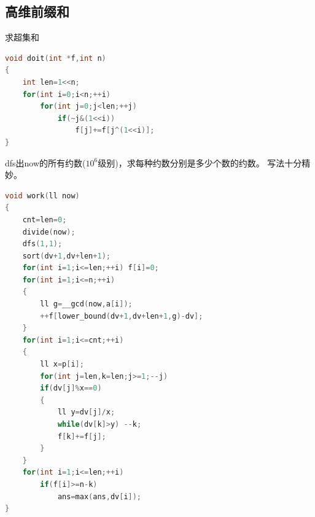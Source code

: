 \documentclass[UTF8,a4paper,titlepage]{ctexart}
\begin{document}
\subsection{高维前缀和}
求超集和
\begin{lstlisting}[language=C++] 
void doit(int *f,int n)
{
    int len=1<<n;
    for(int i=0;i<n;++i)
        for(int j=0;j<len;++j)
            if(~j&(1<<i))
                f[j]+=f[j^(1<<i)];
}
\end{lstlisting}

dfs出now的所有约数($10^6$级别)，求每种约数分别是多少个数的约数。
写法十分精妙。
\begin{lstlisting}[language=C++] 
void work(ll now)
{
    cnt=len=0;
    divide(now);
    dfs(1,1);
    sort(dv+1,dv+len+1);
    for(int i=1;i<=len;++i) f[i]=0;
    for(int i=1;i<=n;++i)
    {
        ll g=__gcd(now,a[i]);
        ++f[lower_bound(dv+1,dv+len+1,g)-dv];
    }
    for(int i=1;i<=cnt;++i)
    {
        ll x=p[i];
        for(int j=len,k=len;j>=1;--j)
        if(dv[j]%x==0)
        {
            ll y=dv[j]/x;
            while(dv[k]>y) --k;
            f[k]+=f[j];
        }
    }
    for(int i=1;i<=len;++i)
        if(f[i]>=n-k)
            ans=max(ans,dv[i]);
}
\end{lstlisting}
\end{document}
